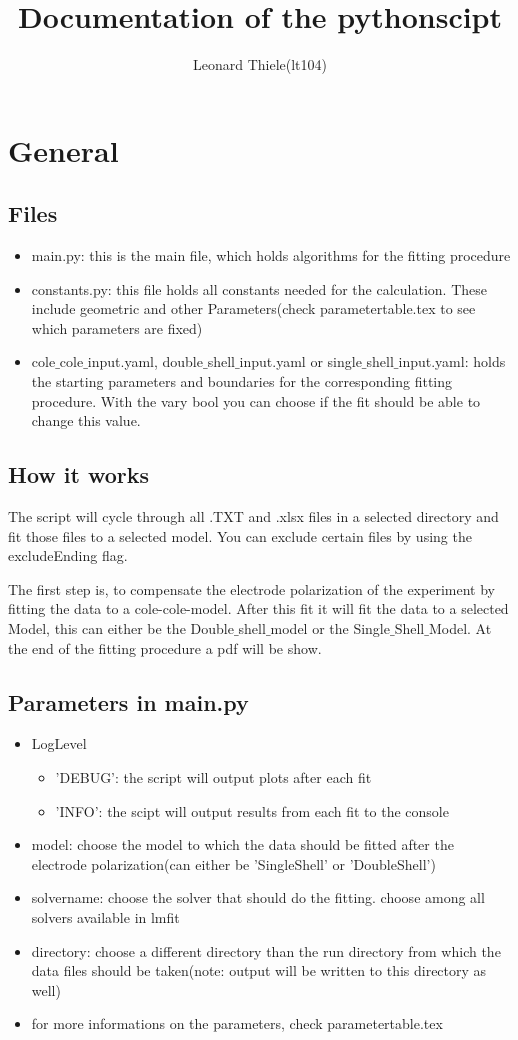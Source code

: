 \documentclass[10pt,a4paper]{article}
\title{Documentation of the pythonscipt}
\author{Leonard Thiele(lt104)}
\renewcommand{\*}{\cdot}
\begin{document}
\section{General}{
\subsection{Files}{
\begin{itemize}
\item main.py: this is the main file, which holds algorithms for the fitting procedure
\item constants.py: this file holds all constants needed for the calculation. These include geometric and other Parameters(check parametertable.tex to see which parameters are fixed)
\item cole$\_$cole$\_$input.yaml, double$\_$shell$\_$input.yaml or single$\_$shell$\_$input.yaml: holds the starting parameters and boundaries for the corresponding fitting procedure. With the vary bool you can choose if the fit should be able to change this value. 
\end{itemize}
}
\subsection{How it works}{
The script will cycle through all .TXT and .xlsx files in a selected directory and fit those files to a selected model. You can exclude certain files by using the excludeEnding flag.

The first step is, to compensate the electrode polarization of the experiment by fitting the data to a cole-cole-model. After this fit it will fit the data to a selected Model, this can either be the Double$\_$shell$\_$model or the Single$\_$Shell$\_$Model. At the end of the fitting procedure a pdf will be show.   
}%
\subsection{Parameters in main.py}{
\begin{itemize}
\item LogLevel \begin{itemize}
\item 'DEBUG': the script will output plots after each fit
\item 'INFO': the scipt will output results from each fit to the console
\end{itemize}
\item model: choose the model to which the data should be fitted after the electrode polarization(can either be 'SingleShell' or 'DoubleShell')
\item solvername: choose the solver that should do the fitting. choose among all solvers available in lmfit
\item directory: choose a different directory than the run directory from which the data files should be taken(note: output will be written to this directory as well)
\item for more informations on the parameters, check parametertable.tex
\end{itemize}
}
}%
\end{document}
